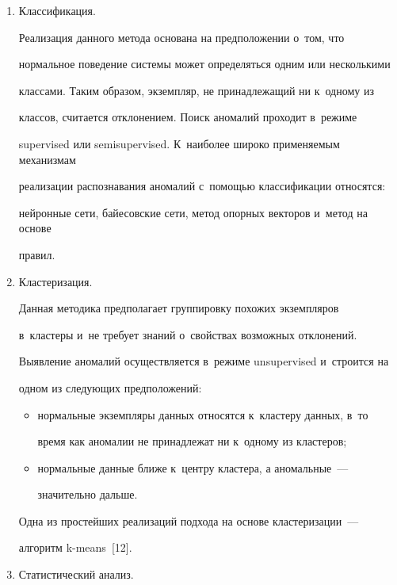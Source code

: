   \begin{enumerate}[1.]


  \item Классификация.


  


  Реализация данного метода основана на предположении о~том, что 


нормальное поведение системы может определяться одним или несколькими 


классами. Таким образом, экземпляр, не принадлежащий ни к~одному из 


классов, считается отклонением. Поиск аномалий проходит в~режиме 


supervised или semisupervised. К~наиболее широко применяемым механизмам 


реализации распознавания аномалий с~помощью классификации относятся: 


нейронные сети, байесовские сети, метод опорных векторов и~метод на основе 


правил.


  \item Кластеризация.


  


  Данная методика предполагает группировку похожих экземпляров 


в~клас\-те\-ры и~не требует знаний о~свойствах возможных отклонений. 


Выявление аномалий осуществляется в~режиме unsupervised и~строится на 


одном из следующих предположений:


  \begin{itemize}


  \item нормальные экземпляры данных относятся к~кластеру данных, в~то 


время как аномалии не принадлежат ни к~одному из кластеров;


  \item нормальные данные ближе к~центру кластера, а аномальные~--- 


значительно дальше.


  \end{itemize}


  Одна из простейших реализаций подхода на основе кластеризации~--- 


алгоритм k-means~[12].


  \item Статистический анализ.



\end{enumerate}
